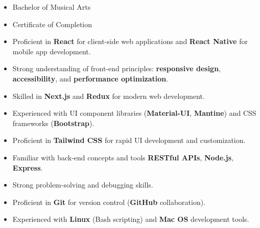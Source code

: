 \documentclass[10pt,letterpaper,withhyper]{altacv}
\begin{document}
\begin{paracol}{2}
	\switchcolumn

	\begin{itemize}
		\item Bachelor of Musical Arts
	\end{itemize}
	
	
	\begin{itemize}
	  \item Certificate of Completion
	\end{itemize}
	\begin{itemize}
		\item Proficient in \textbf{React} for client-side web applications and \textbf{React Native} for mobile app development.
		\item Strong understanding of front-end principles: \textbf{responsive design}, \textbf{accessibility}, and \textbf{performance optimization}.
		\item Skilled in \textbf{Next.js} and \textbf{Redux} for modern web development.
		\item Experienced with UI component libraries (\textbf{Material-UI}, \textbf{Mantine}) and CSS frameworks (\textbf{Bootstrap}).
		\item Proficient in \textbf{Tailwind CSS} for rapid UI development and customization.
		\item Familiar with back-end concepts and tools \textbf{RESTful APIs}, \textbf{Node.js}, \textbf{Express}.
		\item Strong problem-solving and debugging skills.
	\end{itemize}
	
	\divider
	\begin{itemize}
		\item Proficient in \textbf{Git} for version control (\textbf{GitHub} collaboration).
		\item Experienced with \textbf{Linux} (Bash scripting) and \textbf{Mac OS} development tools.
	\end{itemize}
	
\end{paracol}
\end{document}
